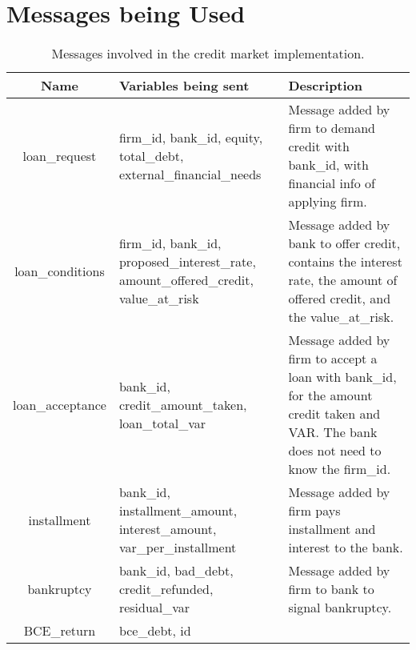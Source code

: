 \section{Messages being Used}



\begin{table}[!htb]\caption{Messages involved in the credit market implementation.}
\begin{center}
\begin{tabular}{|c|l|l|}
\hline
Name & Variables being sent & Description \\
\hline loan\_request & {\parbox[l]{5cm}{firm\_id, bank\_id, equity,
total\_debt, external\_financial\_needs}}& {\parbox[l]{5cm}{Message
added by firm to demand credit with bank\_id,
with financial info of applying firm.}} \\
\hline loan\_conditions & {\parbox[l]{5cm}{firm\_id, bank\_id,
proposed\_interest\_rate, amount\_offered\_credit, value\_at\_risk}}
& {\parbox[l]{5cm}{Message added by bank to offer credit, contains
the interest rate, the amount of
offered credit, and the value\_at\_risk.}}  \\

\hline loan\_acceptance & {\parbox[l]{5cm}{bank\_id,
credit\_amount\_taken, loan\_total\_var}} & {\parbox[l]{5cm}{Message
added by firm to accept a loan with bank\_id, for the amount credit
taken and VAR. The bank
does not need to know the firm\_id.}}   \\
\hline

installment & {\parbox[l]{5cm}{bank\_id, installment\_amount,
interest\_amount, var\_per\_installment}} & {\parbox[l]{5cm}{Message
added by firm pays
installment and interest to the bank.}}    \\

\hline bankruptcy & {\parbox[l]{5cm}{bank\_id, bad\_debt,
credit\_refunded, residual\_var}} &{\parbox[l]{5cm}{Message added by
firm to bank
to signal bankruptcy.}}  \\
\hline BCE\_return &
{\parbox[l]{5cm}{bce\_debt, id}} & {\parbox[l]{5cm}{}}  \\
\hline

\end{tabular}\end{center}\label{tab:creditmarketmsg}
\end{table}
